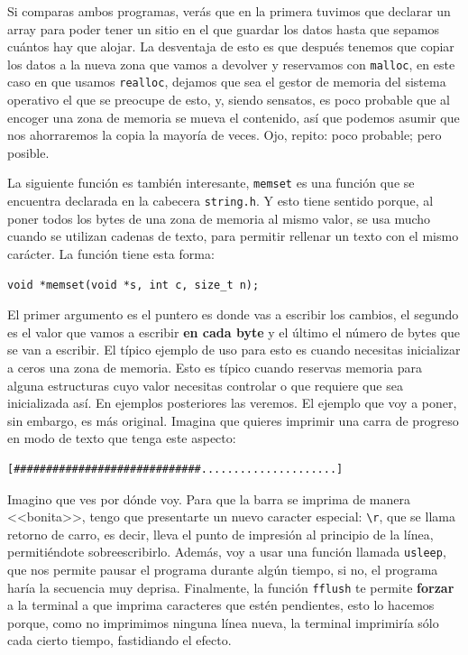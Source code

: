 \documentclass[a4paper]{article}
\begin{document}
Si comparas ambos programas, verás que en la primera tuvimos que declarar un
array para poder tener un sitio en el que guardar los datos hasta que sepamos
cuántos hay que alojar. La desventaja de esto es que después tenemos que copiar
los datos a la nueva zona que vamos a devolver y reservamos con \verb!malloc!,
en este caso en que usamos \verb!realloc!, dejamos que sea el gestor de memoria
del sistema operativo el que se preocupe de esto, y, siendo sensatos, es poco
probable que al encoger una zona de memoria se mueva el contenido, así que
podemos asumir que nos ahorraremos la copia la mayoría de veces. Ojo, repito:
poco probable; pero posible.

La siguiente función es también interesante, \verb!memset! es una función que se
encuentra declarada en la cabecera \verb!string.h!. Y esto tiene sentido porque,
al poner todos los bytes de una zona de memoria al mismo valor, se usa mucho
cuando se utilizan cadenas de texto, para permitir rellenar un texto con el
mismo carácter. La función tiene esta forma:

\noindent
\begin{minipage}[H]{\linewidth}
\mbox{}
\begin{lstlisting}[style=C,
caption={Declaración de la función \texttt{memset}},
label={lst:memsetSignature}]
void *memset(void *s, int c, size_t n);
\end{lstlisting}
\end{minipage}
El primer argumento es el puntero es donde vas a escribir los cambios, el
segundo es el valor que vamos a escribir \textbf{en cada byte} y el último
el número de bytes que se van a escribir. El típico ejemplo de uso para esto
es cuando necesitas inicializar a ceros una zona de memoria. Esto es típico
cuando reservas memoria para alguna estructuras cuyo valor necesitas controlar
o que requiere que sea inicializada así. En ejemplos posteriores las veremos.
El ejemplo que voy a poner, sin embargo, es más original. Imagina que
quieres imprimir una carra de progreso en modo de texto que tenga este aspecto:
\begin{verbatim}
[#############################.....................]
\end{verbatim}
Imagino que ves por dónde voy. Para que la barra se imprima de manera
<<bonita>>, tengo que presentarte un  nuevo caracter especial: \verb!\r!, que
se llama retorno de carro, es decir, lleva el punto de impresión al principio
de la línea, permitiéndote sobreescribirlo. Además, voy a usar una función
llamada \verb!usleep!, que nos permite pausar el programa durante algún tiempo,
si no, el programa haría la secuencia muy deprisa. Finalmente, la función
\verb!fflush! te permite \textbf{forzar} a la terminal a que imprima caracteres
que estén pendientes, esto lo hacemos porque, como no imprimimos ninguna línea
nueva, la terminal imprimiría sólo cada cierto tiempo, fastidiando el efecto.
\end{document}
